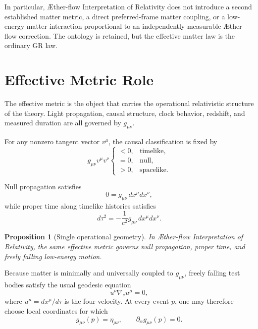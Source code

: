 \documentclass[11pt]{article}
\newcommand{\Aflow}{\AE{}ther-flow}
\newcommand{\TheoryName}{\Aflow{} Interpretation of Relativity}
\newtheorem{proposition}{Proposition}
\begin{document}
In particular, \TheoryName{} does not introduce a second established matter metric, a direct preferred-frame matter coupling, or a low-energy matter interaction proportional to an independently measurable \Aflow{} correction. The ontology is retained, but the effective matter law is the ordinary GR law.

\section{Effective Metric Role}

The effective metric is the object that carries the operational relativistic structure of the theory. Light propagation, causal structure, clock behavior, redshift, and measured duration are all governed by \(g_{\mu\nu}\).

For any nonzero tangent vector \(v^\mu\), the causal classification is fixed by
\begin{equation}
g_{\mu\nu}v^\mu v^\nu
\begin{cases}
<0, & \text{timelike},\\
=0, & \text{null},\\
>0, & \text{spacelike}.
\end{cases}
\label{eq:causalclassification}
\end{equation}

Null propagation satisfies
\begin{equation}
0=g_{\mu\nu}\,dx^{\mu}dx^{\nu},
\label{eq:null}
\end{equation}
while proper time along timelike histories satisfies
\begin{equation}
d\tau^2=-\frac{1}{c^2}g_{\mu\nu}\,dx^{\mu}dx^{\nu}.
\label{eq:propertime}
\end{equation}

\begin{proposition}[Single operational geometry]
In \TheoryName{}, the same effective metric governs null propagation, proper time, and freely falling low-energy motion.
\end{proposition}

Because matter is minimally and universally coupled to \(g_{\mu\nu}\), freely falling test bodies satisfy the usual geodesic equation
\begin{equation}
u^\nu \nabla_\nu u^\mu = 0,
\label{eq:geodesic}
\end{equation}
where \(u^\mu = dx^\mu/d\tau\) is the four-velocity. At every event \(p\), one may therefore choose local coordinates for which
\begin{equation}
g_{\mu\nu}(p)=\eta_{\mu\nu},
\qquad
\partial_\alpha g_{\mu\nu}(p)=0.
\label{eq:localinertial}
\end{equation}
\end{document}
